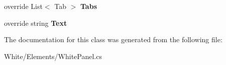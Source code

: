 \begin{DoxyCompactItemize}
\item 
\hypertarget{class_proto_test_1_1_golem_1_1_white_1_1_elements_1_1_white_panel_a3a544cc0d388c42db5240619f80bf086}{override List$<$ Tab $>$ {\bfseries Tabs}}\label{class_proto_test_1_1_golem_1_1_white_1_1_elements_1_1_white_panel_a3a544cc0d388c42db5240619f80bf086}

\item 
\hypertarget{class_proto_test_1_1_golem_1_1_white_1_1_elements_1_1_white_panel_a9cc02e1a9db74240d0fe8e7fcbb4c35f}{override string {\bfseries Text}}\label{class_proto_test_1_1_golem_1_1_white_1_1_elements_1_1_white_panel_a9cc02e1a9db74240d0fe8e7fcbb4c35f}

\end{DoxyCompactItemize}


The documentation for this class was generated from the following file\-:\begin{DoxyCompactItemize}
\item 
White/\-Elements/White\-Panel.\-cs\end{DoxyCompactItemize}
